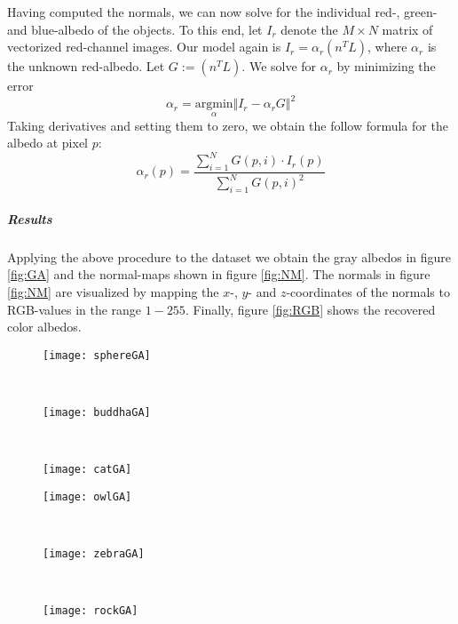 \documentclass{paper}
\begin{document}
Having computed the normals, we can now solve for the individual red-,
green- and blue-albedo of the objects. To this end, let $I_r$ denote
the $M\times N$ matrix of vectorized red-channel images. Our model
again is $I_r=\alpha_r(n^TL)$, where $\alpha_r$ is the unknown
red-albedo. Let $G:=(n^TL)$. We solve for $\alpha_r$ by minimizing the error
\begin{equation} 
\alpha_r = \underset{\alpha} {\mathrm{argmin}} \Vert
I_r-\alpha_rG \Vert^2
\end{equation}
Taking derivatives and setting them to zero, we obtain the follow
formula for the albedo at pixel $p$:
\begin{equation} 
\alpha_r(p) = \frac{\sum_{i=1}^NG(p,i)\cdot I_r(p)}{\sum_{i=1}^NG(p,i)^2}
\end{equation}

\subparagraph{Results} 
Applying the above procedure to the dataset we obtain the gray albedos
in figure \ref{fig:GA} and the normal-maps shown in figure
\ref{fig:NM}. The normals in figure \ref{fig:NM} are visualized by
mapping the $x$-, $y$- and $z$-coordinates of the normals to
RGB-values in the range $1-255$.  Finally, figure \ref{fig:RGB} shows
the recovered color albedos.

\begin{figure*}[h!]
    \centering
    \begin{subfigure}[]{0.33\textwidth}
        \centering
        \texttt{[image: sphereGA]}
    \end{subfigure}%
    ~ 
    \begin{subfigure}[]{0.33\textwidth}
        \centering
        \texttt{[image: buddhaGA]}
    \end{subfigure}%
    ~ 
    \begin{subfigure}[]{0.33\textwidth}
        \centering
        \texttt{[image: catGA]}
    \end{subfigure}
        \begin{subfigure}[]{0.33\textwidth}
        \centering
        \texttt{[image: owlGA]}
    \end{subfigure}%
    ~ 
    \begin{subfigure}[]{0.33\textwidth}
        \centering
        \texttt{[image: zebraGA]}
    \end{subfigure}%
    ~ 
    \begin{subfigure}[]{0.33\textwidth}
        \centering
        \texttt{[image: rockGA]}
    \end{subfigure}

    \caption{Recovered gray albedo}    
\label{fig:GA}

\end{figure*}
\end{document}
